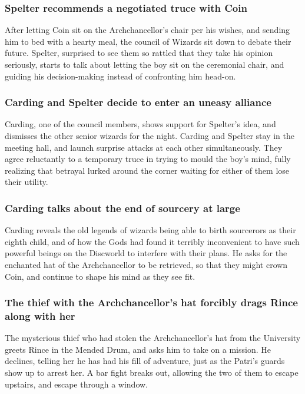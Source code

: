 \subsubsection{\Gls{Spelter} recommends a negotiated truce with \Gls{Coin}}
After letting \Gls{Coin} sit on the Archchancellor's chair per his wishes, and sending him to bed
with a hearty meal, the council of Wizards sit down to debate their future. \Gls{Spelter}, surprised
to see them so rattled that they take his opinion seriously, starts to talk about letting the boy
sit on the ceremonial chair, and guiding his decision-making instead of confronting him head-on.

\subsubsection{\Gls{Carding} and \Gls{Spelter} decide to enter an uneasy alliance}
\Gls{Carding}, one of the council members, shows support for \Gls{Spelter}'s idea, and dismisses
the other senior wizards for the night. \Gls{Carding} and \Gls{Spelter} stay in the meeting hall,
and launch surprise attacks at each other simultaneously. They agree reluctantly to a temporary
truce in trying to mould the boy's mind, fully realizing that betrayal lurked around the corner
waiting for either of them lose their utility.

\subsubsection{\Gls{Carding} talks about the end of sourcery at large}
\Gls{Carding} reveals the old legends of wizards being able to birth sourcerors as their eighth
child, and of how the Gods had found it terribly inconvenient to have such powerful beings on the
Discworld to interfere with their plans. He asks for the enchanted hat of the Archchancellor to
be retrieved, so that they might crown \Gls{Coin}, and continue to shape his mind as they see fit.

\subsubsection{The thief with the Archchancellor's hat forcibly drags \Gls{Rince} along with her}
The mysterious thief who had stolen the Archchancellor's hat from the University greets \Gls{Rince}
in the Mended Drum, and asks him to take on a mission. He declines, telling her he has had his
fill of adventure, just as the \Gls{Patri}'s guards show up to arrest her. A bar fight breaks out,
allowing the two of them to escape upstairs, and escape through a window.

